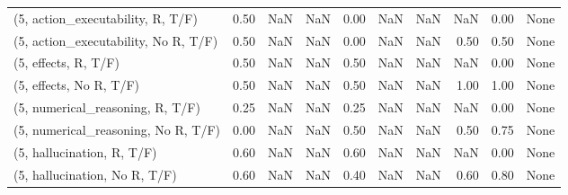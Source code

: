 \begin{table*}[h!]
\begin{adjustbox}{width=2\columnwidth,center}
\begin{tabular}{lrrr|rrr|rrr}
(5, action\_executability, R, T/F)    &                      0.50 &                   NaN &                       NaN &                          0.00 &                       NaN &                           NaN &                                    NaN &                               0.00 &                                  None \\
(5, action\_executability, No R, T/F) &                      0.50 &                   NaN &                       NaN &                          0.00 &                       NaN &                           NaN &                                   0.50 &                               0.50 &                                  None \\
(5, effects, R, T/F)                 &                      0.50 &                   NaN &                       NaN &                          0.50 &                       NaN &                           NaN &                                    NaN &                               0.00 &                                  None \\
(5, effects, No R, T/F)              &                      0.50 &                   NaN &                       NaN &                          0.50 &                       NaN &                           NaN &                                   1.00 &                               1.00 &                                  None \\
(5, numerical\_reasoning, R, T/F)     &                      0.25 &                   NaN &                       NaN &                          0.25 &                       NaN &                           NaN &                                    NaN &                               0.00 &                                  None \\
(5, numerical\_reasoning, No R, T/F)  &                      0.00 &                   NaN &                       NaN &                          0.50 &                       NaN &                           NaN &                                   0.50 &                               0.75 &                                  None \\
(5, hallucination, R, T/F)           &                      0.60 &                   NaN &                       NaN &                          0.60 &                       NaN &                           NaN &                                    NaN &                               0.00 &                                  None \\
(5, hallucination, No R, T/F)        &                      0.60 &                   NaN &                       NaN &                          0.40 &                       NaN &                           NaN &                                   0.60 &                               0.80 &                                  None \\

\end{tabular}
\end{adjustbox}
\end{table*}
